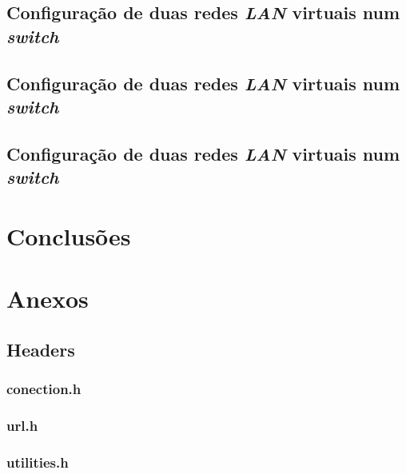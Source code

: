 \documentclass[a4paper]{article}
\begin{document}
	\subsection{Configuração de duas redes \textit{LAN} virtuais num \textit{switch}}

	\subsection{Configuração de duas redes \textit{LAN} virtuais num \textit{switch}}

	\subsection{Configuração de duas redes \textit{LAN} virtuais num \textit{switch}}

	\clearpage

	\section{Conclusões}



	\newpage

	\section{Anexos}
	
	\subsection{Headers}

	\subsubsection{conection.h}

	

	\subsubsection{url.h}

	

	\subsubsection{utilities.h}
\end{document}
